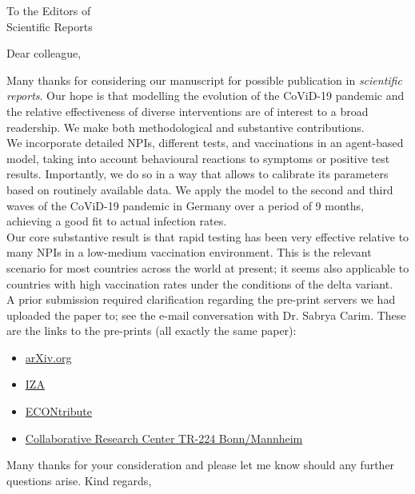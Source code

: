 \documentclass[USenglish, 10pt, UBonn_letterhead]{scrlttr2}
\begin{document}


\begin{letter}{%
        To the Editors of\\
        Scientific Reports \\
    }

    \opening{Dear colleague,}

    Many thanks for considering our manuscript for possible publication in
    \textit{scientific reports}. Our hope is that modelling the evolution of the
    CoViD-19 pandemic and the relative effectiveness of diverse interventions are of
    interest to a broad readership. We make both methodological and substantive
    contributions.\\[0.5ex]
    We incorporate detailed NPIs, different tests, and vaccinations in an agent-based
    model, taking into account behavioural reactions to symptoms or positive test
    results. Importantly, we do so in a way that allows to calibrate its parameters
    based on routinely available data. We apply the model to the second and third waves
    of the CoViD-19 pandemic in Germany over a period of 9 months, achieving a good fit
    to actual infection rates.\\[0.5ex]
    Our core substantive result is that rapid testing has been very effective relative
    to many NPIs in a low-medium vaccination environment. This is the relevant scenario
    for most countries across the world at present; it seems also applicable to countries
    with high vaccination rates under the conditions of the delta variant.\\[0.5ex]
    A prior submission required clarification regarding the pre-print servers we had
    uploaded the paper to; see the e-mail conversation with Dr.{} Sabrya Carim. These are the links to the 
    pre-prints (all exactly the same paper):\\[-2ex]
    \begin{itemize}
        \item \href{https://arxiv.org/abs/2106.11129}{arXiv.org}\\[-2ex]
        \item \href{https://www.iza.org/publications/dp/14510/the-effectiveness-of-strategies-to-contain-sars-cov-2-testing-vaccinations-and-npis}{IZA}\\[-2ex]
        \item \href{https://www.econtribute.de/RePEc/ajk/ajkdps/ECONtribute_100_2021.pdf}{ECONtribute}\\[-2ex]
        \item \href{https://www.crctr224.de/en/research-output/discussion-papers/archive/2021/DP302}{Collaborative Research Center TR-224 Bonn/Mannheim}\\[2ex]
    \end{itemize}

    \closing{Many thanks for your consideration and please let me know should any further questions arise. Kind regards,}

\end{letter}
\end{document}

